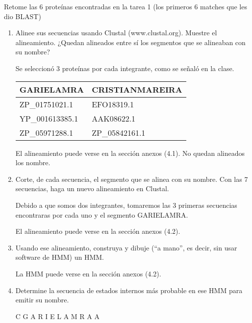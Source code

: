 Retome las 6 proteínas encontradas en la tarea 1 (los primeros 6 matches que les dio BLAST)

\begin{enumerate}
	\item Alinee sus secuencias usando Clustal (www.clustal.org). Muestre el alineamiento. ¿Quedan
		alineados entre sí los segmentos que se alineaban con su nombre?
	

		Se seleccionó 3 proteínas por cada integrante, como se señaló en la clase.\\

		\begin{center}
		\begin{tabular}{|l|l|}
			\hline
			GARIELAMRA & CRISTIANMAREIRA \\
			\hline
			ZP\_01751021.1 & EFO18319.1 \\ 
			YP\_001613385.1 & AAK08622.1 \\
			ZP\_05971288.1 & ZP\_05842161.1 \\
			\hline
		\end{tabular}
		\end{center}

	El alineamiento puede verse en la sección anexos (4.1).	No quedan alineados los nombre.
			

	\item Corte, de cada secuencia, el segmento que se alinea con su nombre. Con las 7 secuencias,
		haga un nuevo alineamiento en Clustal.


		Debido a que somos dos integrantes,
		tomaremos las 3 primeras secuencias encontraras por cada uno y el
		segmento GARIELAMRA.

		 El alineamiento puede verse en la sección anexos (4.2).

	\item Usando ese alineamiento, construya y dibuje (“a mano”, es decir, sin usar software de HMM)
		un HMM.


		 La HMM puede verse en la sección anexos (4.2).

	\item Determine la secuencia de estados internos más probable en ese HMM para emitir su
		nombre.


		\begin{center}
		C G A R I E L A M R A A
		\end{center}

\end{enumerate}
